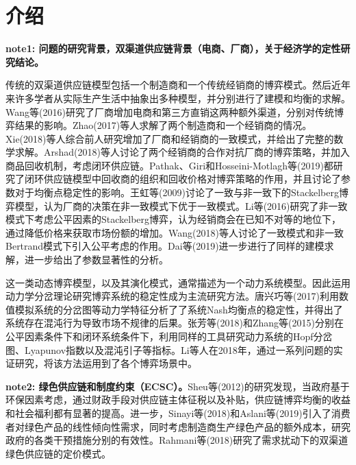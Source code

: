 \documentclass{article}
\begin{document}
\section{介绍}
\par \textbf{note1: 问题的研究背景，双渠道供应链背景（电商、厂商），关于经济学的定性研究结论。}
\par 传统的双渠道供应链模型包括一个制造商和一个传统经销商的博弈模式。然后近年来许多学者从实际生产生活中抽象出多种模型，并分别进行了建模和均衡的求解。Wang等(2016)\cite{2016Wang}研究了厂商增加电商和第三方直销这两种额外渠道，分别对传统博弈结果的影响。Zhao(2017)\cite{2017Zhao}等人求解了两个制造商和一个经销商的情况。Xie(2018)\cite{2018Xie}等人综合前人研究增加了厂商和经销商的一致模式，并给出了完整的数学求解。Arshad(2018)\cite{2018Arshad}等人讨论了两个经销商的合作对抗厂商的博弈策略，并加入商品回收机制，考虑闭环供应链。Pathak、Giri和Hosseini-Motlagh等(2019)\cite{2019Pathak}\cite{2019Giri,2019Hosseini-Motlagh}都研究了闭环供应链模型中回收商的组织和回收价格对博弈策略的作用，并且讨论了参数对于均衡点稳定性的影响。王虹等(2009)\cite{2009Wang}讨论了一致与非一致下的Stackelberg博弈模型，认为厂商的决策在非一致模式下优于一致模式。Li等(2016)\cite{2016Li}研究了非一致模式下考虑公平因素的Stackelberg博弈，认为经销商会在已知不对等的地位下，通过降低价格来获取市场份额的增加。Wang(2018)\cite{2018Wang}等人讨论了一致模式和非一致Bertrand模式下引入公平考虑的作用。Dai等(2019)\cite{2019Dai}进一步进行了同样的建模求解，进一步给出了参数显著性的分析。
\par 这一类动态博弈模型，以及其演化模式，通常描述为一个动力系统模型。因此运用动力学分岔理论研究博弈系统的稳定性成为主流研究方法。唐兴巧等(2017)\cite{2017Tang}利用数值模拟系统的分岔图等动力学特征分析了了系统Nash均衡点的稳定性，并得出了系统存在混沌行为导致市场不规律的后果。张芳等(2018)\cite{2018Zhang}和Zhang等(2015)\cite{2015Zhang}分别在公平因素条件下和闭环系统条件下，利用同样的工具研究动力系统的Hopf分岔图、Lyapunov指数以及混沌引子等指标。Li等人在2018年，通过一系列问题的实证研究，将该方法运用到了各个博弈场景中\cite{2018Huang,2018Qiu-Xiang,2019Qiu-Xiang1,2019Qiu-Xiang2}。
\par \textbf{note2: 绿色供应链和制度约束（ECSC）\cite{2005Beamon}。}Sheu等(2012)\cite{2012Sheu}的研究发现，当政府基于环保因素考虑，通过财政手段对供应链主体征税以及补贴，供应链博弈均衡的收益和社会福利都有显著的提高。进一步，Sinayi等(2018)\cite{2018Sinayi}和Aslani等(2019)\cite{2019Aslani}引入了消费者对绿色产品的线性倾向性需求，同时考虑制造商生产绿色产品的额外成本，研究政府的各类干预措施分别的有效性。Rahmani等(2018)\cite{2018Rahami}研究了需求扰动下的双渠道绿色供应链的定价模式。
\end{document}
